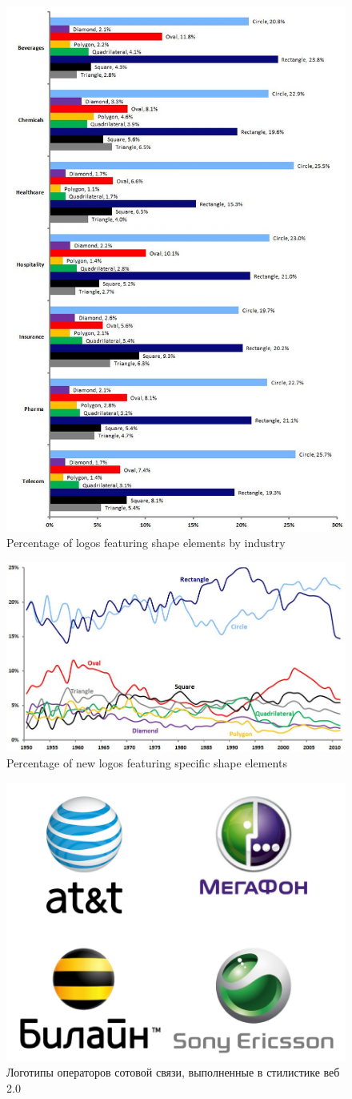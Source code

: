 \begin{figure}[ht]
  \centering
  \includegraphics[width=.5\linewidth]{images/supplement/emblemetrics/shapeindustry}
  \caption{Percentage of logos featuring shape elements by industry}
  \label{fig:emblemetrics:shape-industry}
\end{figure}

\begin{figure}[ht]
  \centering
  \includegraphics[width=.5\linewidth]{images/supplement/emblemetrics/shape}
  \caption{Percentage of new logos featuring specific shape elements}
  \label{fig:emblemetrics:shape}
\end{figure}

\begin{figure}[ht]
  \centering
  \includegraphics[width=.5\linewidth]{images/supplement/emblemetrics/web20}
  \caption{Логотипы операторов сотовой связи, выполненные в стилистике веб 2.0}
  \label{fig:emblemetrics:web20}
\end{figure}
